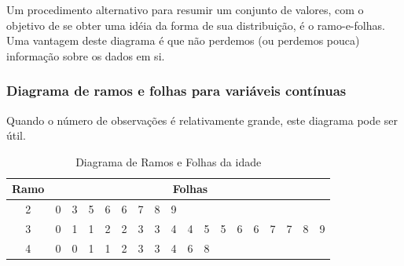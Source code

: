 \documentclass[14pt,aspectratio=1610]{beamer}
\begin{document}
\begin{frame}{}
\frametitle{}
\begin{block}{}
\justifying
Um procedimento alternativo para resumir um conjunto de valores, com o objetivo de se
obter uma idéia da forma de sua distribuição, é o ramo-e-folhas. Uma vantagem deste diagrama é que não perdemos (ou perdemos pouca) informação sobre os dados em si.
\end{block}
\end{frame}

\begin{frame}{}
\frametitle{Diagrama de ramos e folhas para variáveis contínuas}
\begin{block}{}
\justifying
Quando o número de observações é relativamente grande, este diagrama pode ser útil.
\begin{table}[H]
\caption{Diagrama de Ramos e Folhas da idade}
\begin{tabular}{c|ccccccccccccccccc}
Ramo&\multicolumn{17}{c}{Folhas}\\
\hline
2&0&3&5&6&6&7&8&9& & & & & & & & & \\
3&0&1&1&2&2&3&3&4&4&5&5&6&6&7&7&8&9\\
4&0&0&1&1&2&3&3&4&6&8& & & & & & & 
\end{tabular}
\end{table}
\end{block}
\end{frame}
\end{document}
